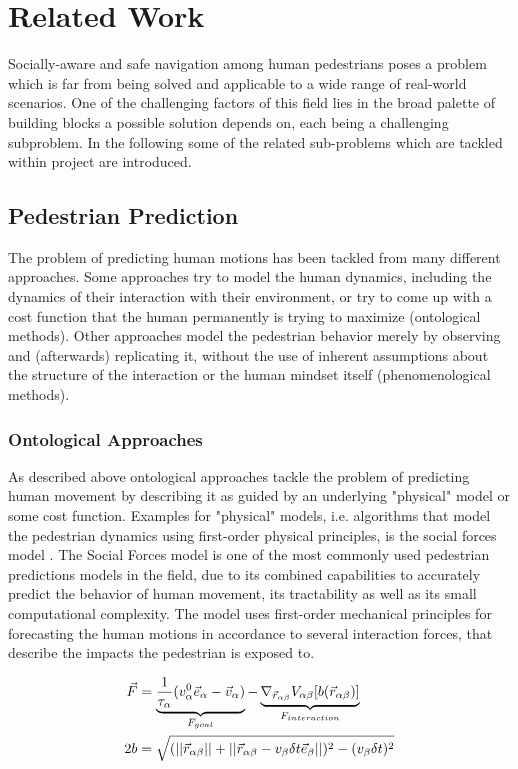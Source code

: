 \chapter{Related Work}
\label{text:related}
Socially-aware and safe navigation among human pedestrians poses a problem which is far from being solved and applicable to a wide range of real-world scenarios. One of the challenging factors of this field lies in the broad palette of building blocks a possible solution depends on, each being a challenging subproblem. In the following some of the related sub-problems which are tackled within project \project are introduced.

\section{Pedestrian Prediction}
\label{text:related/prediction}
The problem of predicting human motions has been tackled from many different approaches. Some approaches try to model the human dynamics, including the dynamics of their interaction with their environment, or try to come up with a  cost function that the human permanently is trying to maximize (ontological methods). Other approaches model the pedestrian behavior merely by observing and (afterwards) replicating it, without the use of inherent assumptions about the structure of the interaction or the human mindset itself (phenomenological methods).

\subsection{Ontological Approaches}
As described above ontological approaches tackle the problem of predicting human movement by describing it as guided by an underlying "physical" model or some cost function. Examples for "physical" models, i.e. algorithms that model the pedestrian dynamics using first-order physical principles, is the social forces model \cite{Helbing1995}. The Social Forces model is one of the most commonly used pedestrian predictions models in the field, due to its combined capabilities to accurately predict the behavior of human movement, its tractability as well as its small computational complexity. The model uses first-order mechanical principles for forecasting the human motions in accordance to several interaction forces, that describe the impacts the pedestrian is exposed to. 

\begin{align}
\vec{F} &= \underbrace{\frac{1}{\tau_{\alpha}} (v^0_{\alpha} \vec{e}_{\alpha} - \vec{v}_{\alpha})}_{F_{goal}} - \underbrace{\nabla_{\vec{r}_{\alpha \beta}} V_{\alpha \beta}[b(\vec{r}_{\alpha \beta})]}_{F_{interaction}} 
\label{eq:social_forces} \\
2b &= \sqrt{(||\vec{r}_{\alpha \beta}|| + ||\vec{r}_{\alpha \beta} - v_{\beta} \delta t \vec{e}_{\beta}||)^2 - (v_{\beta} \delta t)^2}
\end{align}

